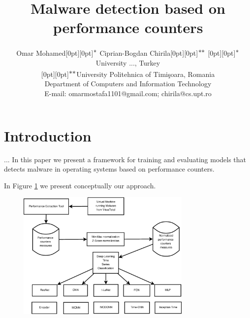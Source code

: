 \documentclass[conference]{IEEEtran}
\begin{document}
\title{Malware detection based on performance counters}

\DeclareRobustCommand*{\IEEEauthorrefmark}[1]{\raisebox{0pt}[0pt][0pt]{\textsuperscript{\footnotesize\ensuremath{
 \ifcase#1\or {*}\or {**}\or {{**}*}\or {{**}{**}}\or 5\or 6\or 7\or 8 \else\textsuperscript{\expandafter\romannumeral#1}\fi}}}}

\author
{
 \IEEEauthorblockN
 {
   Omar Mohamed\IEEEauthorrefmark{1}
 }
 \IEEEauthorblockN
 {
  Ciprian-Bogdan Chirila\IEEEauthorrefmark{2}
 }
 \IEEEauthorblockA
 {\IEEEauthorrefmark{1}University ..., Turkey\\
  \IEEEauthorrefmark{2}University Politehnica of Timi\c{s}oara, Romania\\
  Department of Computers and Information Technology\\
  E-mail:
	omarmostafa1101@gmail.com; 
	chirila@cs.upt.ro
 }
}

\maketitle

\begin{abstract}
\end{abstract}


\section{Introduction}
\label{sec:introduction}
...
In this paper we present a framework for training and evaluating models that detects malware in operating systems based on performance counters.

\cite{xAPI2019}

In Figure \ref{fig:approach} we present conceptually our approach.
\begin{figure}[!ht]
\centering
\includegraphics[width=8.5cm]{fig-approach.eps}
\caption{}
\label{fig:approach}
\end{figure}
\end{document}
